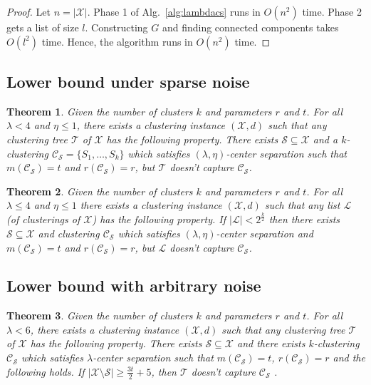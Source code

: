 \documentclass[letterpaper,12pt,titlepage,oneside,final]{book}
\newtheorem{theorem}{Theorem}
\newcommand{\mc}{\mathcal}
\begin{document}
\begin{proof}
Let $n = |\mc X|$. Phase 1 of Alg.~\ref{alg:lambdacs} runs in $O(n^2)$ time. Phase 2 gets a list of size $l$. Constructing $G$ and finding connected components takes $O(l^2)$ time. Hence, the algorithm runs in $O(n^2)$ time.
\end{proof}


\subsection{Lower bound under sparse noise}
\label{section:lambdaLowerBoundSparse}
\begin{theorem}
\label{thm:noalglambdacs}
Given the number of clusters $k$ and parameters $r$ and $t$. For all $\lambda < 4$ and $\eta \le 1$, there exists a clustering instance $(\mc X , d)$ such that any clustering tree $\mc T$ of $\mc X$ has the following property. There exists $\mc S \subseteq \mc X$ and a $k$-clustering $\mc C_{\mc S} = \{S_1, \ldots, S_k\}$ which satisfies $(\lambda, \eta)$-center separation such that $m(\mc C_{\mc S}) = t$ and $r(\mc C_{\mc S}) = r$, but $\mc T$ doesn't capture $\mc C_{\mc S}$.
\end{theorem}

\begin{theorem}
\label{thm:nolistlambdacs}
Given the number of clusters $k$ and parameters $r$ and $t$. For all $\lambda \le 4$ and $\eta \le 1$ there exists a clustering instance $(\mc X, d)$ such that any list $\mc L$ (of clusterings of $\mc X$) has  the following property. If $|\mc L| < 2^{\frac{k}{2}}$ then there exists $\mc S \subseteq \mc X$ and clustering $\mc C_{\mc S}$ which satisfies $(\lambda, \eta)$-center separation and $ m(\mc C_{\mc S}) = t$ and $r(\mc C_{\mc S}) = r$, but $\mc L$ doesn't capture $\mc C_{\mc S}$.
\end{theorem}


\subsection{Lower bound with arbitrary noise}
\label{section:lambdaLowerBoundArbitrary}
\vspace{-0.1in}
\begin{theorem}
\label{thm:nosparselambdaalg}
Given the number of clusters $k$ and parameters $r$ and $t$. For all $\lambda < 6$, there exists a clustering instance $(\mc X , d)$ such that any clustering tree $\mc T$ of $\mc X$ has the following property. There exists $\mc S \subseteq \mc X$ and there exists $k$-clustering $\mc C_{\mc S}$ which satisfies $\lambda$-center separation such that $m(\mc C_{\mc S}) = t$, $r(\mc C_{\mc S}) = r$ and the following holds. If $|\mc X\setminus \mc S|\ge \frac{3t}{2}+5$, then $\mc T$ doesn't capture $\mc C_{\mc S}$ .
\end{theorem}
\end{document}
